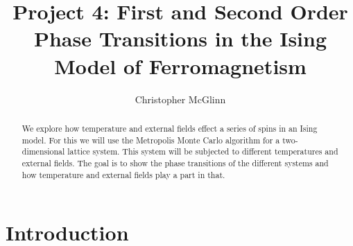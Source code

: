 \documentclass[pra,twocolumn,showpacs,amsmath,amssymb]{revtex4-2}
\begin{document}
\title{Project 4: First and Second Order Phase Transitions in the Ising
Model of Ferromagnetism}


\author{Christopher McGlinn}

\begin{abstract}
We explore how temperature and external fields effect a series of spins in an Ising model. For this we will use the Metropolis Monte Carlo algorithm for a two-dimensional lattice system. This system will be subjected to different temperatures and external fields. The goal is to show the phase transitions of the different systems and how temperature and external fields play a part in that.
\end{abstract}



\maketitle

\section{Introduction} \label{sec:intro}
\end{document}
